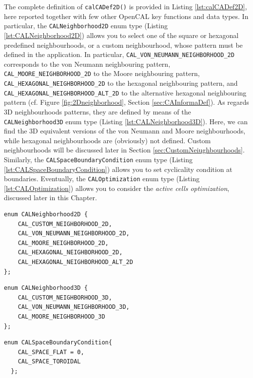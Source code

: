 The complete definition of \verb'calCADef2D()' is provided in Listing
\ref{lst:calCADef2D}, here reported together with few other OpenCAL
key functions and data types. In particular, the
\verb'CALNeighborhood2D' enum type (Listing
\ref{lst:CALNeighborhood2D}) allows you to select one of the square or
hexagonal predefined neighbourhoods, or a custom neighbourhood, whose
pattern must be defined in the application. In particular,
\verb'CAL_VON_NEUMANN_NEIGHBORHOOD_2D' corresponds to the von Neumann
neighbouring pattern, \verb'CAL_MOORE_NEIGHBORHOOD_2D' to the Moore
neighbouring pattern, \verb'CAL_HEXAGONAL_NEIGHBORHOOD_2D' to the
hexagonal neighbouring pattern, and
\verb'CAL_HEXAGONAL_NEIGHBORHOOD_ALT_2D' to the alternative hexagonal
neighbouring pattern (cf. Figure \ref{fig:2Dneighborhood}, Section
\ref{sec:CAInformaDef}). As regards 3D neighbourhoods patterns, they
are defined by means of the \verb'CALNeighborhood3D' enum type
(Listing \ref{lst:CALNeighborhood3D}). Here, we can find the 3D
equivalent versions of the von Neumann and Moore neighbourhoods, while
hexagonal neighbourhoods are (obviously) not defined. Custom
neighbourhoods will be discussed later in Section
\ref{sec:CustomNeiughbourhoods}. Similarly, the
\verb'CALSpaceBoundaryCondition' enum type (Listing
\ref{lst:CALSpaceBoundaryCondition}) allows you to set cyclicality
condition at boundaries. Eventually, the \verb'CALOptimization' enum
type (Listing \ref{lst:CALOptimization}) allows you to consider the
\emph{active cells optimization}, discussed later in this Chapter.

\begin{lstlisting}[float,floatplacement=H, label=lst:CALNeighborhood2D, caption=The CALNeighborhood2D enum type., numbers=none]
  enum CALNeighborhood2D { 
    CAL_CUSTOM_NEIGHBORHOOD_2D,
    CAL_VON_NEUMANN_NEIGHBORHOOD_2D,
    CAL_MOORE_NEIGHBORHOOD_2D,
    CAL_HEXAGONAL_NEIGHBORHOOD_2D,
    CAL_HEXAGONAL_NEIGHBORHOOD_ALT_2D 
};
\end{lstlisting}  

\begin{lstlisting}[float,floatplacement=H, label=lst:CALNeighborhood3D, caption=The CALNeighborhood3D enum type., numbers=none]
  enum CALNeighborhood3D {
    CAL_CUSTOM_NEIGHBORHOOD_3D,
    CAL_VON_NEUMANN_NEIGHBORHOOD_3D,
    CAL_MOORE_NEIGHBORHOOD_3D
};
\end{lstlisting}  


\begin{lstlisting}[float,floatplacement=H, label=lst:CALSpaceBoundaryCondition, caption=The CALSpaceBoundaryCondition enum type., numbers=none]
  enum CALSpaceBoundaryCondition{
    CAL_SPACE_FLAT = 0,         
    CAL_SPACE_TOROIDAL
  };
\end{lstlisting}

